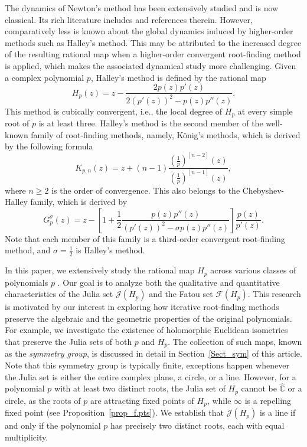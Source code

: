 \documentclass[12pt]{article}
\begin{document}
The dynamics of Newton’s method has been extensively studied and is now classical. Its rich literature includes \cite{HSS2001,Lei1997,Felex1989} and references therein. However, comparatively less is known about the global dynamics induced by higher-order methods such as Halley’s method. This may be attributed to the increased degree of the resulting rational map when a higher-order convergent root-finding method is applied, which makes the associated dynamical study more challenging. Given a complex polynomial $ p $, Halley's method is defined by the rational map
\begin{equation}\label{H_formula}
H_p(z) = z - \frac{2p(z)p'(z)}{2(p'(z))^2 - p(z)p''(z)}.
\end{equation}
This method is cubically convergent, i.e., the local degree of $H_p$ at every simple root of $p$ is at least three. Halley's method is the second member of the well-known family of root-finding methods, namely, K\"{o}nig's methods, which is derived by the following formula
$$K_{p,n}(z)=z+(n-1)\frac{\left(\frac{1}{p}\right)^{[n-2]}(z)}{\left(\frac{1}{p}\right)^{[n-1]}(z)},$$
where $n\geq 2$ is the order of convergence.
This also belongs to the Chebyshev-Halley family, which is derived by
$$
G^{\sigma}_p(z)=z-\left[1+\frac{1}{2}\dfrac{p(z)p''(z)}{(p'(z))^2-\sigma p(z)p''(z)}\right]\frac{p(z)}{p'(z)}.
$$
Note that each member of this family is a third-order convergent root-finding method, and $\sigma=\frac{1}{2}$ is Halley's method.
\par
In this paper, we extensively study the rational map $ H_p $  across various classes of polynomials $ p $ . Our goal is to analyze both the qualitative and quantitative characteristics of the Julia set $ \mathcal{J}(H_p) $ and the Fatou set $ \mathcal{F}(H_p) $. This research is motivated by our interest in exploring how iterative root-finding methods preserve the algebraic and the geometric properties of the original polynomials. For example, we investigate the existence of holomorphic Euclidean isometries that preserve the Julia sets of both $ p $ and $ H_p $. The collection of such maps, known as the \textit{symmetry group}, is discussed in detail in Section~\ref{Sect_sym} of this article. Note that this symmetry group is typically finite, exceptions happen whenever the Julia set is either the entire complex plane, a circle, or a line. However, for a polynomial $ p $ with at least two distinct roots, the Julia set of $ H_p $ cannot be $ \widehat{\mathbb{C}} $ or a circle, as the roots of $ p $ are attracting fixed points of  $ H_p $, while $ \infty $ is a repelling fixed point (see Proposition~\ref{prop_f.pts}). We establish that $ \mathcal{J}(H_p) $ is a line if and only if the polynomial $ p $ has precisely two distinct roots, each with equal multiplicity.
\end{document}
